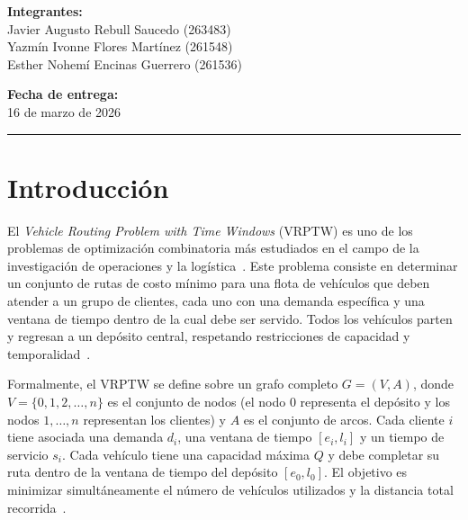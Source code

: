 \documentclass[12pt, letterpaper]{article}
\begin{document}
\begin{titlepage}
\begin{center}
    {\large\bfseries\color{azulUACJ} Integrantes:}\\[0.3cm]
    {\large
      Javier Augusto Rebull Saucedo (263483)\\[0.2cm]
      Yazmín Ivonne Flores Martínez (261548)\\[0.2cm]
      Esther Nohemí Encinas Guerrero (261536)
    }

    \vfill

    {\large\bfseries\color{azulUACJ} Fecha de entrega:}\\[0.3cm]
    {\large 16 de marzo de 2026}

    \vspace{0.5cm}

    {\color{azulUACJ}\rule{\textwidth}{2pt}}

  \end{center}
\end{titlepage}

\newpage
\tableofcontents
\newpage

\section{Introducción}
\label{sec:introduccion}

El \textit{Vehicle Routing Problem with Time Windows} (VRPTW) es uno de los problemas de optimización combinatoria más estudiados en el campo de la investigación de operaciones y la logística~\cite{solomon1987}. Este problema consiste en determinar un conjunto de rutas de costo mínimo para una flota de vehículos que deben atender a un grupo de clientes, cada uno con una demanda específica y una ventana de tiempo dentro de la cual debe ser servido. Todos los vehículos parten y regresan a un depósito central, respetando restricciones de capacidad y temporalidad~\cite{hasle2007}.

Formalmente, el VRPTW se define sobre un grafo completo $G = (V, A)$, donde $V = \{0, 1, 2, \ldots, n\}$ es el conjunto de nodos (el nodo $0$ representa el depósito y los nodos $1, \ldots, n$ representan los clientes) y $A$ es el conjunto de arcos. Cada cliente $i$ tiene asociada una demanda $d_i$, una ventana de tiempo $[e_i, l_i]$ y un tiempo de servicio $s_i$. Cada vehículo tiene una capacidad máxima $Q$ y debe completar su ruta dentro de la ventana de tiempo del depósito $[e_0, l_0]$. El objetivo es minimizar simultáneamente el número de vehículos utilizados y la distancia total recorrida~\cite{gambardella1999}.
\end{document}
